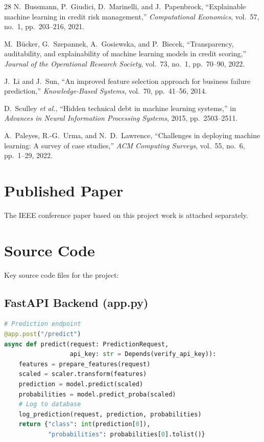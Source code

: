 \documentclass[12pt,a4paper]{report}
\begin{document}
\begin{thebibliography}{28}
 N.~Bussmann, P.~Giudici, D.~Marinelli, and J.~Papenbrock, ``Explainable machine learning in credit risk management,'' \textit{Computational Economics}, vol.~57, no.~1, pp.~203--216, 2021.

 M.~B\"{u}cker, G.~Szepannek, A.~Gosiewska, and P.~Biecek, ``Transparency, auditability, and explainability of machine learning models in credit scoring,'' \textit{Journal of the Operational Research Society}, vol.~73, no.~1, pp.~70--90, 2022.

 J.~Li and J.~Sun, ``An improved feature selection approach for business failure prediction,'' \textit{Knowledge-Based Systems}, vol.~70, pp.~41--56, 2014.

 D.~Sculley \textit{et al.}, ``Hidden technical debt in machine learning systems,'' in \textit{Advances in Neural Information Processing Systems}, 2015, pp.~2503--2511.

 A.~Paleyes, R.-G.~Urma, and N.~D.~Lawrence, ``Challenges in deploying machine learning: A survey of case studies,'' \textit{ACM Computing Surveys}, vol.~55, no.~6, pp.~1--29, 2022.

\end{thebibliography}


\appendix
\chapter{Published Paper}
The IEEE conference paper based on this project work is attached separately.

\chapter{Source Code}
Key source code files for the project:

\section{FastAPI Backend (app.py)}
\begin{lstlisting}[language=Python]
# Prediction endpoint
@app.post("/predict")
async def predict(request: PredictionRequest,
                  api_key: str = Depends(verify_api_key)):
    features = prepare_features(request)
    scaled = scaler.transform(features)
    prediction = model.predict(scaled)
    probabilities = model.predict_proba(scaled)
    # Log to database
    log_prediction(request, prediction, probabilities)
    return {"class": int(prediction[0]),
            "probabilities": probabilities[0].tolist()}
\end{lstlisting}
\end{document}
